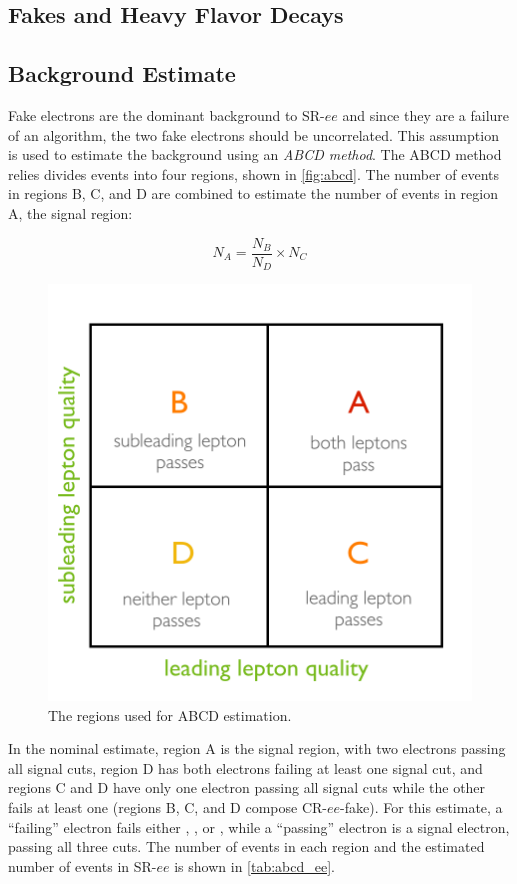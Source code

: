 \subsection{Fakes and Heavy Flavor Decays}

\subsection{Background Estimate}
Fake electrons are the dominant background to SR-$ee$ and since they are a failure of an algorithm, the two fake electrons should be uncorrelated. This assumption is used to estimate the background using an \emph{ABCD method}. The ABCD method relies divides events into four regions, shown in \autoref{fig:abcd}. The number of events in regions B, C, and D are combined to estimate the number of events in region A, the signal region:

\begin{equation}
N_A = \frac{N_B}{N_D}\times N_C
\end{equation}


\begin{figure}[htbp]
\centering
\includegraphics[width=.5\textwidth]{figures/otherbackgrounds/abcd.png}
\caption{The regions used for ABCD estimation.}
\label{fig:abcd}
\end{figure}


In the nominal estimate, region A is the signal region, with two electrons passing all signal cuts, region D has both electrons failing at least one signal cut, and regions C and D have only one electron passing all signal cuts while the other fails at least one (regions B, C, and D compose CR-$ee$-fake). For this estimate, a ``failing'' electron fails either \dpt, \chiID, or \nmiss, while a ``passing'' electron is a signal electron, passing all three cuts. The number of events in each region and the estimated number of events in SR-$ee$ is shown in \autoref{tab:abcd_ee}.

